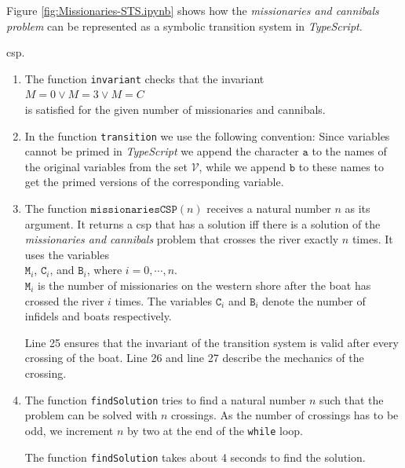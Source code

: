 Figure \ref{fig:Missionaries-STS.ipynb} shows how the \emph{missionaries and cannibals problem} can be
represented as a symbolic transition system in \textsl{TypeScript}.


\Gls{csp}.
\begin{enumerate}
\item The function \texttt{invariant} checks that the invariant
      \\[0.2cm]
      \hspace*{1.3cm}
      $M = 0 \vee M = 3 \vee M = C$
      \\[0.2cm]
      is satisfied for the given number of missionaries and cannibals.
\item In the function \texttt{transition} 
      we use the following convention: Since variables cannot be primed in
      \textsl{TypeScript} we append the character $\mathtt{a}$ to the names of the original
      variables from the set $\mathcal{V}$, while we append $\mathtt{b}$ to these names to get the primed versions of the
      corresponding variable.
\item The function $\mathtt{missionariesCSP}(n)$ receives a natural number $n$ as its argument.
       It returns a \Gls{csp} that has a solution iff there is a solution of the \emph{missionaries and cannibals}
       problem that crosses the river exactly $n$ times.  It uses the variables
       \\[0.2cm]
       \hspace*{1.3cm}
       $\mathtt{M}_i$, $\mathtt{C}_i$, and $\mathtt{B}_i$, where $i=0,\cdots,n$.
       \\[0.2cm]
       $\mathtt{M}_i$ is the number of missionaries on the western shore after the boat has crossed the river
       $i$ times. The variables $\mathtt{C}_i$ and $\texttt{B}_i$ denote the number of infidels and boats
       respectively.

       Line 25 ensures that the invariant of the transition system is valid after every crossing of the boat.
       Line 26 and line 27 describe the mechanics of the crossing.
\item The function \texttt{findSolution} tries to find a natural number $n$ such that the problem can be solved
       with $n$ crossings. As the number of crossings has to be odd, we increment $n$ by
       two at the end of the \texttt{while} loop.

       The function \texttt{findSolution} takes about 4 seconds to find the solution.
\end{enumerate}

